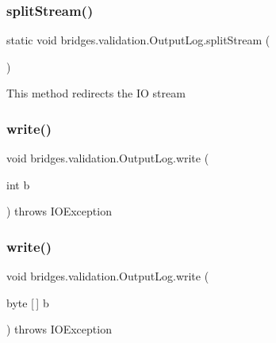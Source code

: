\subsubsection{\texorpdfstring{split\+Stream()}{splitStream()}}
{\footnotesize\ttfamily static void bridges.\+validation.\+Output\+Log.\+split\+Stream (\begin{DoxyParamCaption}{ }\end{DoxyParamCaption})\hspace{0.3cm}{\ttfamily [static]}}

This method redirects the IO stream \mbox{\label{classbridges_1_1validation_1_1_output_log_a68ed2055f1a0626674675354feeb9d54}} 
\subsubsection{\texorpdfstring{write()}{write()}\hspace{0.1cm}{\footnotesize\ttfamily [1/3]}}
{\footnotesize\ttfamily void bridges.\+validation.\+Output\+Log.\+write (\begin{DoxyParamCaption}\item[{int}]{b }\end{DoxyParamCaption}) throws I\+O\+Exception}

\mbox{\label{classbridges_1_1validation_1_1_output_log_a6489f70aa4e2903456ed05315dd59f31}} 
\subsubsection{\texorpdfstring{write()}{write()}\hspace{0.1cm}{\footnotesize\ttfamily [2/3]}}
{\footnotesize\ttfamily void bridges.\+validation.\+Output\+Log.\+write (\begin{DoxyParamCaption}\item[{byte \mbox{[}$\,$\mbox{]}}]{b }\end{DoxyParamCaption}) throws I\+O\+Exception}

